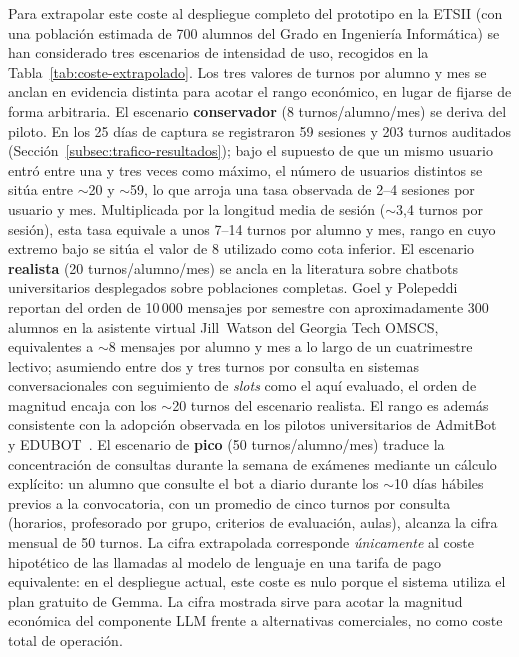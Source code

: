 Para extrapolar este coste al despliegue completo del prototipo en la ETSII (con una población estimada de 700 alumnos del Grado en Ingeniería Informática) se han considerado tres escenarios de intensidad de uso, recogidos en la Tabla~\ref{tab:coste-extrapolado}. Los tres valores de turnos por alumno y mes se anclan en evidencia distinta para acotar el rango económico, en lugar de fijarse de forma arbitraria. El escenario \textbf{conservador} (8 turnos/alumno/mes) se deriva del piloto. En los 25 días de captura se registraron 59 sesiones y 203 turnos auditados (Sección~\ref{subsec:trafico-resultados}); bajo el supuesto de que un mismo usuario entró entre una y tres veces como máximo, el número de usuarios distintos se sitúa entre $\sim$20 y $\sim$59, lo que arroja una tasa observada de 2--4 sesiones por usuario y mes. Multiplicada por la longitud media de sesión ($\sim$3{,}4 turnos por sesión), esta tasa equivale a unos 7--14 turnos por alumno y mes, rango en cuyo extremo bajo se sitúa el valor de 8 utilizado como cota inferior. El escenario \textbf{realista} (20 turnos/alumno/mes) se ancla en la literatura sobre chatbots universitarios desplegados sobre poblaciones completas. Goel y Polepeddi~\cite{goel2018jillwatson} reportan del orden de 10\,000 mensajes por semestre con aproximadamente 300 alumnos en la asistente virtual Jill~Watson del Georgia Tech OMSCS, equivalentes a $\sim$8 mensajes por alumno y mes a lo largo de un cuatrimestre lectivo; asumiendo entre dos y tres turnos por consulta en sistemas conversacionales con seguimiento de \textit{slots} como el aquí evaluado, el orden de magnitud encaja con los $\sim$20 turnos del escenario realista. El rango es además consistente con la adopción observada en los pilotos universitarios de AdmitBot~\cite{gupta2019admitbot} y EDUBOT~\cite{colace2018edubot}. El escenario de \textbf{pico} (50 turnos/alumno/mes) traduce la concentración de consultas durante la semana de exámenes mediante un cálculo explícito: un alumno que consulte el bot a diario durante los $\sim$10 días hábiles previos a la convocatoria, con un promedio de cinco turnos por consulta (horarios, profesorado por grupo, criterios de evaluación, aulas), alcanza la cifra mensual de 50 turnos. La cifra extrapolada corresponde \emph{únicamente} al coste hipotético de las llamadas al modelo de lenguaje en una tarifa de pago equivalente: en el despliegue actual, este coste es nulo porque el sistema utiliza el plan gratuito de Gemma. La cifra mostrada sirve para acotar la magnitud económica del componente LLM frente a alternativas comerciales, no como coste total de operación.

